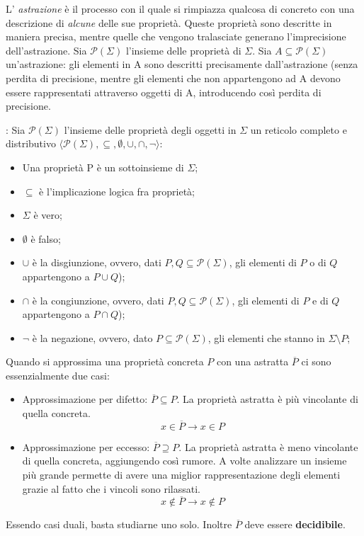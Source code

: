 \documentclass[a4paper, 10pt]{book}
\newcommand{\Pp}{\mathcal{P}}
\newenvironment{definition}[1][Definizione]{\begin{trivlist}
\item[\hskip \labelsep {\bfseries #1}]}{\end{trivlist}}
\begin{document}
    L' \emph{astrazione} è il processo con il quale si rimpiazza qualcosa di concreto con una descrizione di
    \emph{alcune} delle sue proprietà. Queste proprietà sono descritte in maniera precisa, mentre quelle
    che vengono tralasciate generano l'imprecisione dell'astrazione.
    \newline
    Sia $\Pp(\Sigma)$ l'insieme delle proprietà di $\Sigma$. Sia $A \subseteq\Pp(\Sigma)$ un'astrazione:
    gli elementi in A sono descritti precisamente dall'astrazione (senza perdita di precisione,
    mentre gli elementi che non appartengono ad A devono essere rappresentati attraverso oggetti di A,
    introducendo così perdita di precisione.
    
    \begin{definition}[Reticolo delle proprietà]: Sia $\Pp(\Sigma)$ l'insieme delle proprietà degli oggetti
        in $\Sigma$ un reticolo completo e distributivo 
        $\langle \Pp(\Sigma), \subseteq, \emptyset, \cup, \cap, \neg \rangle$:
        \begin{itemize}
            \item Una proprietà P è un sottoinsieme di $\Sigma$;
            \item $\subseteq$ è l'implicazione logica fra proprietà;
            \item $\Sigma$ è vero;
            \item $\emptyset$ è falso;
            \item $\cup$ è la disgiunzione, ovvero, dati $P,Q \subseteq \Pp(\Sigma)$,
                gli elementi di $P$ o di $Q$ appartengono a $P \cup Q$);
            \item $\cap$ è la congiunzione, ovvero, dati $P,Q \subseteq \Pp(\Sigma)$,
                gli elementi di $P$ e di $Q$ appartengono a $P \cap Q$);
            \item $\neg$ è la negazione, ovvero, dato $P \subseteq \Pp(\Sigma)$,
                gli elementi che stanno in $\Sigma \setminus P$;
        \end{itemize}
    \end{definition}
    
    Quando si approssima una proprietà concreta $P$ con una astratta $\overline{P}$ ci sono essenzialmente
    due casi:
    \begin{itemize}
        \item Approssimazione per difetto: $\overline{P} \subseteq P$. La proprietà astratta è più vincolante
            di quella concreta. $$x \in \overline{P} \to x \in P$$
        \item Approssimazione per eccesso: $\overline{P} \supseteq P$. La proprietà astratta è meno vincolante
        di quella concreta, aggiungendo così rumore. A volte analizzare un insieme più grande permette
        di avere una miglior rappresentazione degli elementi grazie al fatto che i vincoli sono rilassati.
        $$x \notin \overline{P} \to x \notin P$$
    \end{itemize}
    Essendo casi duali, basta studiarne uno solo. Inoltre $\overline{P}$ deve essere \textbf{decidibile}.
    
\end{document}
